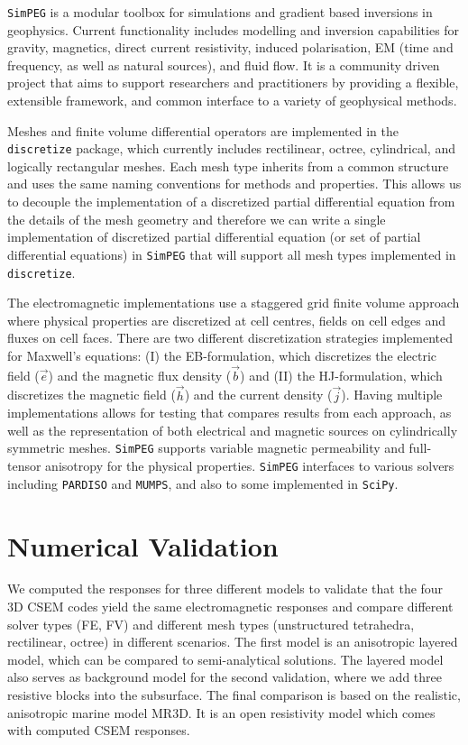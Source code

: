 \documentclass[onecolumn,extra,camera]{gji}
\newcommand{\simpeg}{\texttt{SimPEG}\xspace}
\newcommand{\discretize}{\texttt{discretize}\xspace}
\begin{document}
\simpeg is a modular toolbox for simulations and gradient based inversions in geophysics. Current functionality includes modelling and inversion capabilities for gravity, magnetics, direct current resistivity, induced polarisation, EM (time and frequency, as well as natural sources), and fluid flow. It is a community driven project that aims to support researchers and practitioners by providing a flexible, extensible framework, and common interface to a variety of geophysical methods.

Meshes and finite volume differential operators are implemented in the \discretize package, which currently includes rectilinear, octree, cylindrical, and logically rectangular meshes. Each mesh type inherits from a common structure and uses the same naming conventions for methods and properties. This allows us to decouple the implementation of a discretized partial differential equation from the details of the mesh geometry and therefore we can write a single implementation of discretized partial differential equation (or set of partial differential equations) in \simpeg that will support all mesh types implemented in \discretize.

The electromagnetic implementations use a staggered grid finite volume approach where physical properties are discretized at cell centres, fields on cell edges and fluxes on cell faces. There are two different discretization strategies implemented for Maxwell's equations: (I) the EB-formulation, which discretizes the electric field ($\vec{e}$) and the magnetic flux density ($\vec{b}$) and (II) the HJ-formulation, which discretizes the magnetic field ($\vec{h}$) and the current density ($\vec{j}$). Having multiple implementations allows for testing that compares results from each approach, as well as the representation of both electrical and magnetic sources on cylindrically symmetric meshes. \simpeg supports variable magnetic permeability and full-tensor anisotropy for the physical properties. \simpeg interfaces to various solvers including \texttt{PARDISO} and \texttt{MUMPS}, and also to some implemented in \texttt{SciPy}.

\section{Numerical Validation}

We computed the responses for three different models to validate that the four 3D CSEM codes yield the same electromagnetic responses and compare different solver types (FE, FV) and different mesh types (unstructured tetrahedra, rectilinear, octree) in different scenarios. The first model is an anisotropic layered model, which can be compared to semi-analytical solutions. The layered model also serves as background model for the second validation, where we add three resistive blocks into the subsurface. The final comparison is based on the realistic, anisotropic marine model MR3D. It is an open resistivity model which comes with computed CSEM responses.
\end{document}
